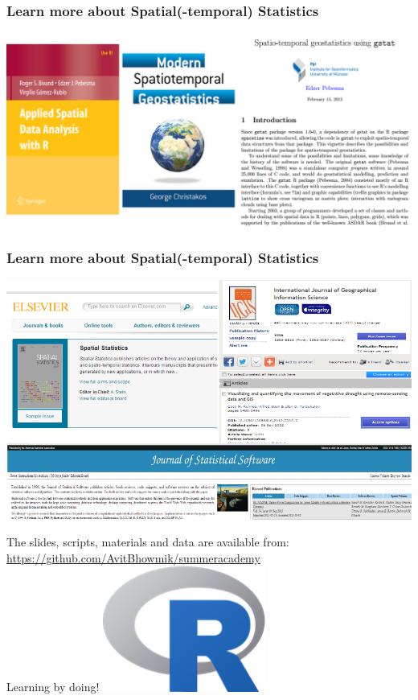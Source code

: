\documentclass{beamer}
\begin{document}
\begin{frame}
\frametitle{Learn more about Spatial(-temporal) Statistics}
\centering
\includegraphics[width=\textwidth]{Figures/books.png}
\end{frame}


\begin{frame}
\frametitle{Learn more about Spatial(-temporal) Statistics}
\centering
\includegraphics[width=\textwidth]{Figures/journals.png}
\end{frame}


\begin{frame}
\centering
The slides, scripts, materials and data are available from:\\
\href{https://github.com/AvitBhowmik/summer_academy_15}{\alert{https://github.com/AvitBhowmik/summer\textunderscore academy}}\\
\vspace{1cm}
\Huge Learning by doing!
\includegraphics[width=0.4\textwidth]{Figures/Rlogo.png}
\end{frame}
\end{document}
